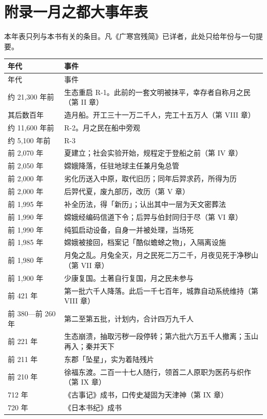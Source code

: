 \chapter*{附录一\quad 月之都大事年表}
{}

\noindent
本年表只列与本书有关的条目。凡《广寒宫残简》已详者，此处只给年份与一句提要。

\begingroup
\small
\renewcommand{\arraystretch}{1.18}
\begin{longtable}{@{}p{26mm}p{112mm}@{}}
\toprule
年代 & 事件\\
\midrule
\endfirsthead
\toprule
年代 & 事件\\
\midrule
\endhead
\bottomrule
\endfoot
约 21{,}300 年前 & 生态重启 R-1。此前的一套文明被抹平，幸存者自称月之民（第 II 章）\\
其后数百年 & 造月船。开工三十一万二千人，完工十五万人（第 VIII 章）\\
约 11{,}600 年前 & R-2。月之民在船中旁观\\
约 5{,}100 年前 & R-3\\
前 2{,}070 年 & 夏建立；社会实验开始，规程定于登船之前（第 IV 章）\\
前 2{,}050 年 & 嫦娥降落，任驻地球主任兼月兔总管\\
前 2{,}000 年 & 劣化历送入中原，取代旧历；同年后羿求药，所得为历\\
前 2{,}000 年 & 后羿代夏，废九部历，改历（第 V 章）\\
前 1{,}995 年 & 补全历法，得「新历」；认出其中一层为天文密葬法\\
前 1{,}990 年 & 嫦娥经编码信道下令；后羿与伯封同归于尽（第 VI 章）\\
前 1{,}990 年 & 纯狐启动设备，自身一并被处理，当场死\\
前 1{,}985 年 & 嫦娥被接回，档案记「酷似蟾蜍之物」，入隔离设施\\
前 1{,}980 年 & 月兔之乱。月兔全灭，月之民死二万二千，月夜见死于净秽山（第 VII 章）\\
前 1{,}900 年 & 少康复国。土著自行复国，月之民未参与\\
前 421 年 & 第一批六千人降落。此后一千七百年，城靠自动系统维持（第 VIII 章）\\
前 380—前 260 年 & 第二至第五批，计划内，合计四万九千人\\
前 221 年 & 生态崩溃，抽取污秽一段停转；第六批六万五千人撤离；玉山再入；秦并天下\\
前 211 年 & 东郡「坠星」，实为着陆残片\\
前 210 年 & 徐福东渡。二百一十七人随行，领首二人原职为医药与织作（第 IX 章）\\
712 年 & 《古事记》成书，口传史凝固为天津神（第 IX 章）\\
720 年 & 《日本书纪》成书\\
\end{longtable}
\endgroup

